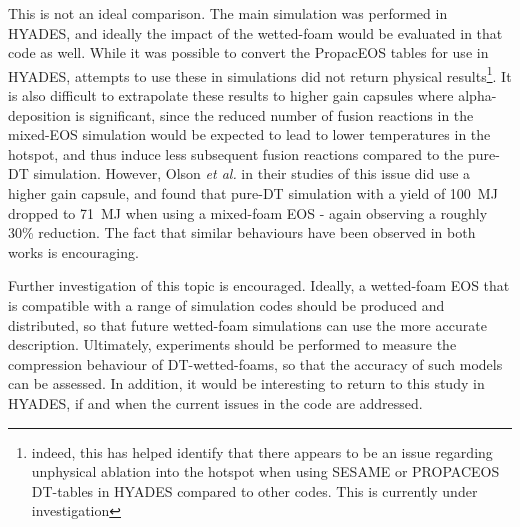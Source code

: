 This is not an ideal comparison. The main simulation was performed in HYADES, and ideally the impact of the wetted-foam would be evaluated in that code as well. While it was possible to convert the PropacEOS tables for use in HYADES, attempts to use these in simulations did not return physical results\footnote{indeed, this has helped identify that there appears to be an issue regarding unphysical ablation into the hotspot when using SESAME or PROPACEOS DT-tables in HYADES compared to other codes. This is currently under investigation}. It is also difficult to extrapolate these results to higher gain capsules where alpha-deposition is significant, since the reduced number of fusion reactions in the mixed-EOS simulation would be expected to lead to lower temperatures in the hotspot, and thus induce less subsequent fusion reactions compared to the pure-DT simulation. However, Olson \textit{et al.} in their studies of this issue did use a higher gain capsule, and found that pure-DT simulation with a yield of 100~MJ dropped to 71~MJ when using a mixed-foam EOS - again observing a roughly 30\% reduction. The fact that similar behaviours have been observed in both works is encouraging.

Further investigation of this topic is encouraged. Ideally, a wetted-foam EOS that is compatible with a range of simulation codes should be produced and distributed, so that future wetted-foam simulations can use the more accurate description. Ultimately, experiments should be performed to measure the compression behaviour of DT-wetted-foams, so that the accuracy of such models can be assessed. In addition, it would be interesting to return to this study in HYADES, if and when the current issues in the code are addressed.




